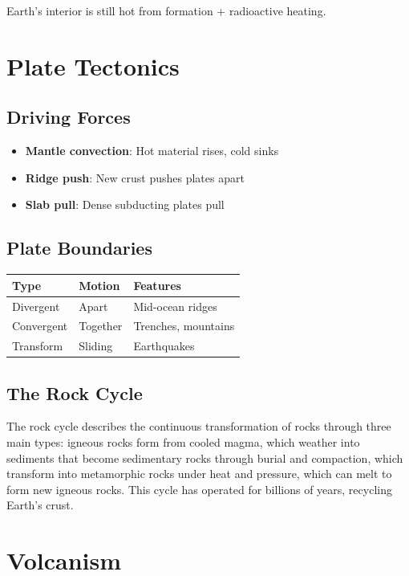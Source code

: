 \documentclass[
  11pt,
  letterpaper,
  twoside,
  openright]{book}
\providecommand{\tightlist}{%
  \setlength{\itemsep}{0pt}\setlength{\parskip}{0pt}}
\begin{document}
Earth's interior is still hot from formation + radioactive heating.

\section{Plate Tectonics}\label{plate-tectonics}

\subsection{Driving Forces}\label{driving-forces}

\begin{itemize}
\tightlist
\item
  \textbf{Mantle convection}: Hot material rises, cold sinks
\item
  \textbf{Ridge push}: New crust pushes plates apart
\item
  \textbf{Slab pull}: Dense subducting plates pull
\end{itemize}

\subsection{Plate Boundaries}\label{plate-boundaries}

\begin{longtable}[]{@{}lll@{}}
\toprule\noalign{}
Type & Motion & Features \\
\midrule\noalign{}
\endhead
\bottomrule\noalign{}
\endlastfoot
Divergent & Apart & Mid-ocean ridges \\
Convergent & Together & Trenches, mountains \\
Transform & Sliding & Earthquakes \\
\end{longtable}

\subsection{The Rock Cycle}\label{the-rock-cycle}

The rock cycle describes the continuous transformation of rocks through
three main types: igneous rocks form from cooled magma, which weather
into sediments that become sedimentary rocks through burial and
compaction, which transform into metamorphic rocks under heat and
pressure, which can melt to form new igneous rocks. This cycle has
operated for billions of years, recycling Earth's crust.

\section{Volcanism}\label{volcanism}
\end{document}
